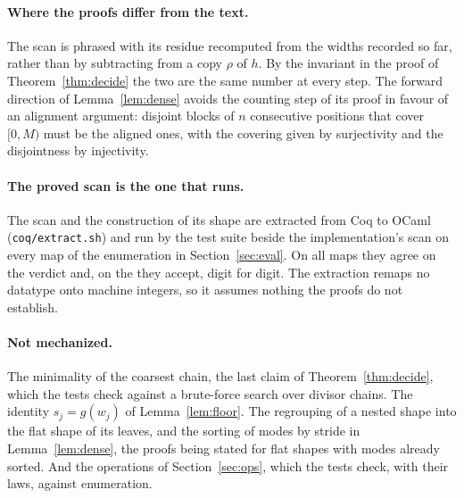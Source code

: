 \paragraph{Where the proofs differ from the text.} The scan is phrased with
its residue recomputed from the widths recorded so far, rather than by
subtracting from a copy $\rho$ of $h$. By the invariant in the proof of
Theorem~\ref{thm:decide} the two are the same number at every step. The
forward direction of Lemma~\ref{lem:dense} avoids the counting step of its
proof in favour of an alignment argument: disjoint blocks of $n$ consecutive
positions that cover $[0,M)$ must be the aligned ones, with the covering given
by surjectivity and the disjointness by injectivity.

\paragraph{The proved scan is the one that runs.} The scan and the
construction of its shape are extracted from Coq to OCaml
(\texttt{coq/extract.sh}) and run by the test suite beside the
implementation's scan on every map of the enumeration in
Section~\ref{sec:eval}. On all \evalExtractedMaps{} maps they agree on the
verdict and, on the \evalExtractedStrided{} they accept, digit for digit. The
extraction remaps no datatype onto machine integers, so it assumes nothing the
proofs do not establish.

\paragraph{Not mechanized.} The minimality of the coarsest chain, the last
claim of Theorem~\ref{thm:decide}, which the tests check against a brute-force
search over divisor chains. The identity $s_j = g(w_j)$ of
Lemma~\ref{lem:floor}. The regrouping of a nested shape into the flat shape of
its leaves, and the sorting of modes by stride in Lemma~\ref{lem:dense}, the
proofs being stated for flat shapes with modes already sorted. And the
operations of Section~\ref{sec:ops}, which the tests check, with their laws,
against enumeration.
